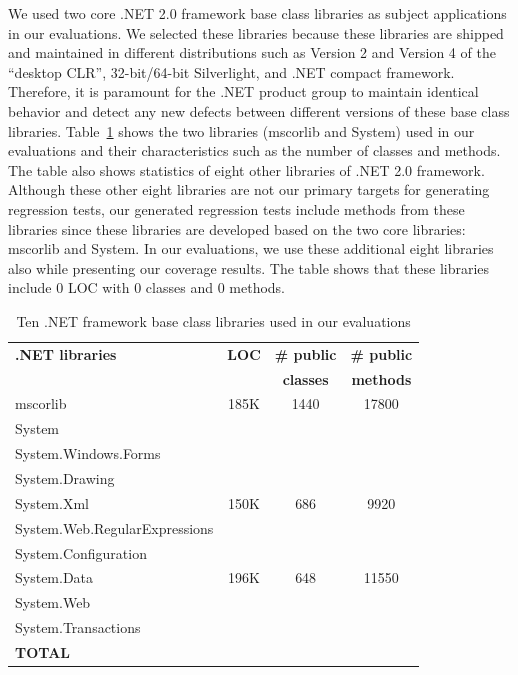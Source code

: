 We used two core .NET 2.0 framework base class libraries as subject applications in our evaluations. We selected these libraries because these libraries are shipped and maintained in different distributions such as Version 2 and Version 4 of the ``desktop CLR'', 32-bit/64-bit Silverlight, and .NET compact framework. Therefore, it is paramount for the .NET product group to maintain identical behavior and detect any new defects between different versions of these base class libraries. Table~\ref{tab:subjects} shows the two libraries (mscorlib and System) used in our evaluations and their characteristics such as the number of classes and methods. The table also shows statistics of eight other libraries of .NET 2.0 framework. Although these other eight libraries are not our primary targets for generating regression tests, our generated regression tests include methods from these libraries since these libraries are developed based on the two core libraries: mscorlib and System. In our evaluations, we use these additional eight libraries also while presenting our coverage results. The table shows that these libraries include $0$ LOC with $0$ classes and $0$ methods.

\setlength{\tabcolsep}{1pt}
\begin{table}[t]
\begin{SmallOut}
\begin{CodeOut}
\begin{center}
\begin {tabular} {|l|c|c|c|}
\hline
\textbf{.NET libraries} & \textbf{LOC} & \textbf{\# public} & \textbf{\# public}\\ 
 & & \textbf{classes} & \textbf{methods}\\ 
\hline
\hline  mscorlib & 185K & 1440 & 17800 \\
\hline  System & & & \\
\hline  System.Windows.Forms & & & \\
\hline  System.Drawing & & & \\
\hline  System.Xml & 150K & 686 & 9920 \\
\hline  System.Web.RegularExpressions & & & \\
\hline  System.Configuration & & & \\
\hline  System.Data & 196K & 648 & 11550 \\
\hline  System.Web &  & & \\
\hline  System.Transactions & & & \\
\hline \textbf{TOTAL} &  &  &   \\
\hline
\end{tabular}
\end{center}
\end{CodeOut}
\end{SmallOut}\vspace*{-4ex}
\centering \caption {\label{tab:subjects}Ten .NET framework base class libraries used in our evaluations}
\end{table}

